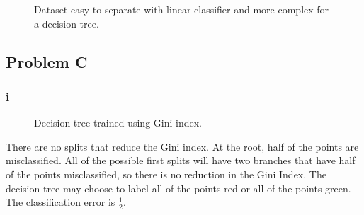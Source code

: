 \documentclass[12pt]{article} %
\begin{document}
\begin{figure}[H]
	\vspace{-10mm}
	\caption{Dataset easy to separate with linear classifier and more complex for a decision tree.}
\end{figure}

\subsection{Problem C}
\subsubsection{i}
\begin{figure}[H]
	\vspace{-10mm}
	\caption{Decision tree trained using Gini index.}
\end{figure}

There are no splits that reduce the Gini index. At the root, half of the points are misclassified. All of the possible first splits will have two branches that have half of the points misclassified, so there is no reduction in the Gini Index. The decision tree may choose to label all of the points red or all of the points green. The classification error is $\frac{1}{2}$.
\end{document}
